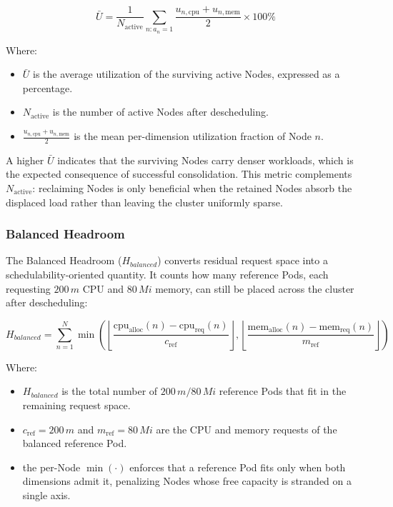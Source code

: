 \[
\bar{U}
=
\frac{1}{N_{\text{active}}}
\sum_{n : a_n = 1}
\frac{u_{n,\text{cpu}} + u_{n,\text{mem}}}{2}
\times 100\%
\]

Where:

\begin{itemize}
    \item \(\bar{U}\) is the average utilization of the surviving active Nodes, expressed as a percentage.

    \item \(N_{\text{active}}\) is the number of active Nodes after descheduling.

    \item \(\frac{u_{n,\text{cpu}} + u_{n,\text{mem}}}{2}\) is the mean per-dimension utilization fraction of Node \(n\).
\end{itemize}

A higher \(\bar{U}\) indicates that the surviving Nodes carry denser workloads, which is the expected consequence of successful consolidation. This metric complements \(N_{\text{active}}\): reclaiming Nodes is only beneficial when the retained Nodes absorb the displaced load rather than leaving the cluster uniformly sparse.

\subsubsection{Balanced Headroom}
\label{subsubsec:defrag_metric_headroom}
The Balanced Headroom (\(H_{balanced}\)) converts residual request space into a schedulability-oriented quantity. It counts how many reference Pods, each requesting \(200\,m\) CPU and \(80\,Mi\) memory, can still be placed across the cluster after descheduling:

\[
H_{balanced}
=
\sum_{n=1}^{N}
\min\!\left(
\left\lfloor
\frac{\text{cpu}_{\text{alloc}}(n) - \text{cpu}_{\text{req}}(n)}{c_{\text{ref}}}
\right\rfloor,
\left\lfloor
\frac{\text{mem}_{\text{alloc}}(n) - \text{mem}_{\text{req}}(n)}{m_{\text{ref}}}
\right\rfloor
\right)
\]

Where:

\begin{itemize}
    \item \(H_{balanced}\) is the total number of \(200\,m/80\,Mi\) reference Pods that fit in the remaining request space.

    \item \(c_{\text{ref}} = 200\,m\) and \(m_{\text{ref}} = 80\,Mi\) are the CPU and memory requests of the balanced reference Pod.

    \item the per-Node \(\min(\cdot)\) enforces that a reference Pod fits only when both dimensions admit it, penalizing Nodes whose free capacity is stranded on a single axis.
\end{itemize}

